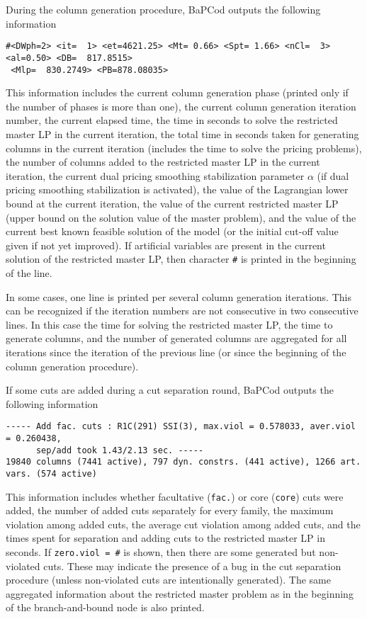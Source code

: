 \documentclass[10pt,a4paper]{article}
\newcommand{\bc}{BaPCod\xspace}
\begin{document}
\medskip  During the column generation procedure, \bc outputs the following information
\scriptsize
\begin{verbatim}
#<DWph=2> <it=  1> <et=4621.25> <Mt= 0.66> <Spt= 1.66> <nCl=  3> <al=0.50> <DB=  817.8515> 
 <Mlp=  830.2749> <PB=878.08035> 
\end{verbatim}
\normalsize This information includes the current column generation phase (printed only if the number of phases is more
than one), the current column generation iteration number, the current elapsed time, the time in seconds to solve the
restricted master LP in the current iteration, the total time in seconds taken for generating columns in the current
iteration (includes the time to solve the pricing problems), the number of columns added to the restricted master LP in
the current iteration, the current dual pricing smoothing stabilization parameter $\alpha$ (if dual pricing smoothing
stabilization is activated), the value of the Lagrangian lower bound at the current iteration, the value of the current
restricted master LP (upper bound on the solution value of the master problem), and the value of the current best known
feasible solution of the model (or the initial cut-off value given if not yet improved). If artificial variables are
present in the current solution of the restricted master LP, then character \verb+#+ is printed in the beginning of the
line.

In some cases, one line is printed per several column generation iterations. This can be recognized if the iteration
numbers are not consecutive in two consecutive lines. In this case the time for solving the restricted master LP, the
time to generate columns, and the number of generated columns are aggregated for all iterations since the iteration of
the previous line (or since the beginning of the column generation procedure).

\medskip If some cuts are added during a cut separation round, \bc outputs the following information
\scriptsize
\begin{verbatim}
----- Add fac. cuts : R1C(291) SSI(3), max.viol = 0.578033, aver.viol = 0.260438, 
      sep/add took 1.43/2.13 sec. -----
19840 columns (7441 active), 797 dyn. constrs. (441 active), 1266 art. vars. (574 active)
\end{verbatim}
\normalsize This information includes whether facultative (\verb+fac.+) or core (\verb+core+) cuts were added, the
number of added cuts separately for every family, the maximum violation among added cuts, the average cut violation
among added cuts, and the times spent for separation and adding cuts to the restricted master LP in seconds. If
\verb+zero.viol = #+ is shown, then there are some generated but non-violated cuts. These may indicate the presence of a
bug in the cut separation procedure (unless non-violated cuts are intentionally generated). The same aggregated
information about the restricted master problem as in the beginning of the branch-and-bound node is also printed.
\end{document}
